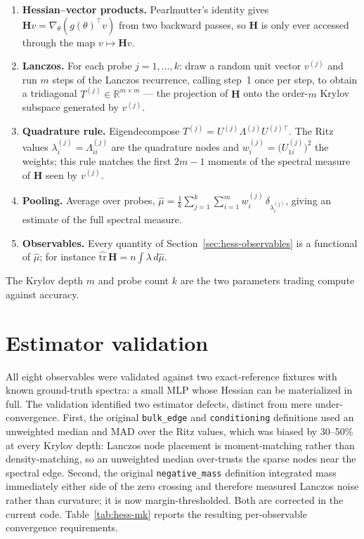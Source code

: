 \documentclass[11pt,a4paper]{article}
\newcommand{\R}{\mathbb{R}}
\newcommand{\bH}{\mathbf{H}}
\begin{document}
\begin{enumerate}[leftmargin=*,itemsep=1pt]
    \item \textbf{Hessian--vector products.} Pearlmutter's identity gives
    $\bH v = \nabla_\theta\!\left(g(\theta)^\top v\right)$ from two backward
    passes, so $\bH$ is only ever accessed through the map $v \mapsto \bH v$.
    \item \textbf{Lanczos.} For each probe $j = 1,\dots,k$: draw a random unit
    vector $v^{(j)}$ and run $m$ steps of the Lanczos recurrence, calling
    step~1 once per step, to obtain a tridiagonal
    $T^{(j)} \in \R^{m \times m}$ --- the projection of $\bH$ onto the order-$m$
    Krylov subspace generated by $v^{(j)}$.
    \item \textbf{Quadrature rule.} Eigendecompose
    $T^{(j)} = U^{(j)} \Lambda^{(j)} U^{(j)\top}$. The Ritz values
    $\lambda_i^{(j)} = \Lambda^{(j)}_{ii}$ are the quadrature nodes and
    $w_i^{(j)} = \big(U^{(j)}_{1i}\big)^2$ the weights; this rule matches the
    first $2m-1$ moments of the spectral measure of $\bH$ seen by $v^{(j)}$.
    \item \textbf{Pooling.} Average over probes,
    $\hat\mu = \frac{1}{k}\sum_{j=1}^{k}\sum_{i=1}^{m} w_i^{(j)}\,
    \delta_{\lambda_i^{(j)}}$, giving an estimate of the full spectral measure.
    \item \textbf{Observables.} Every quantity of
    Section~\ref{sec:hess-observables} is a functional of $\hat\mu$; for
    instance $\widehat{\mathrm{tr}}\,\bH = n\!\int\!\lambda \, d\hat\mu$.
\end{enumerate}

The Krylov depth $m$ and probe count $k$ are the two parameters trading compute
against accuracy.

\newpage

\section{Estimator validation}
\label{sec:hess-validation}

All eight observables were validated against two exact-reference fixtures with
known ground-truth spectra: a small MLP whose Hessian can be materialized in full. The validation identified two estimator
defects, distinct from mere under-convergence. First, the original
\texttt{bulk\_edge} and \texttt{conditioning} definitions used an unweighted
median and MAD over the Ritz values, which was biased by 30--50\% at every
Krylov depth: Lanczos node placement is moment-matching rather than
density-matching, so an unweighted median over-trusts the sparse nodes near the
spectral edge. Second, the original \texttt{negative\_mass} definition
integrated mass immediately either side of the zero crossing and therefore
measured Lanczos noise rather than curvature; it is now margin-thresholded. Both
are corrected in the current code. Table~\ref{tab:hess-mk} reports the resulting
per-observable convergence requirements.
\end{document}
